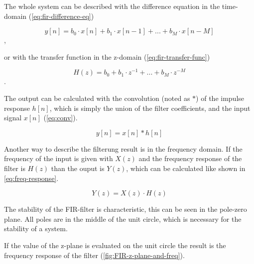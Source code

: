 The whole system can be described with the difference equation in the time-domain (\autoref{eq:fir-difference-eq})

\begin{equation}
    y[n] = b_0 \cdot x[n] + b_1 \cdot x[n-1] + ... + b_M \cdot x[n-M]
    \label{eq:fir-difference-eq}
\end{equation},

or with the transfer function in the z-domain (\autoref{eq:fir-transfer-func})

\begin{equation}
    H(z) = b_0 + b_1 \cdot z^{-1} + ... + b_M \cdot z^{-M}
    \label{eq:fir-transfer-func}
\end{equation}.

The output can be calculated with the convolution (noted as $*$) of the impulse response $h[n]$, which is simply the
union of the filter coefficients, and the input signal $x[n]$ (\autoref{eq:conv}).

\begin{equation}
    y[n] = x[n] * h[n]
    \label{eq:conv}
\end{equation}

Another way to describe the filterung result is in the frequency domain.
If the frequency of the input is given with $X(z)$ and the frequency response of the filter is $H(z)$
than the ouput is $Y(z)$, which can be calculated like shown in \autoref{eq:freq-response}.

\begin{equation}
    Y(z) = X(z) \cdot H(z)
    \label{eq:freq-response}
\end{equation}

The stability of the \ac{FIR}-filter is characteristic, this can be seen in the pole-zero plane. All poles are in
the middle of the unit circle, which is necessary for the stability of a system.

If the value of the z-plane is evaluated on the unit circle the result is the frequency response of the filter
(\autoref{fig:FIR-z-plane-and-freq}).

